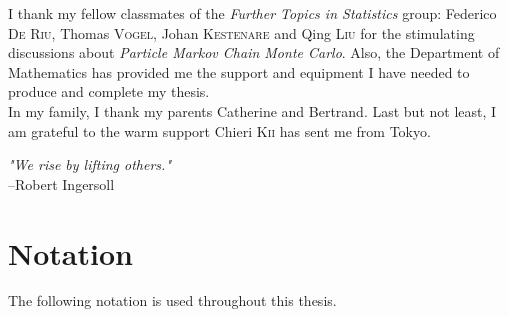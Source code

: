 \documentclass[11pt,a4,twosided,singlespacing,titlepagenumber=on]{scrreprt}
\numberwithin{equation}{chapter} %
\theoremstyle{remark}
\begin{document}
I thank my fellow classmates of the \textit{Further Topics in Statistics} group: Federico \textsc{De Riu}, Thomas \textsc{Vogel}, Johan \textsc{Kestenare} and Qing \textsc{Liu} for the stimulating discussions about \textit{Particle Markov Chain Monte Carlo}. Also, the Department of Mathematics has provided me the support and equipment I have needed to produce and complete my thesis. \\

In my family, I thank my parents Catherine and Bertrand. Last but not least, I am grateful to the warm support Chieri \textsc{Kii} has sent me from Tokyo. \\ 

\begin{flushright} \textit{"We rise by lifting others."} \\
--Robert Ingersoll \\
\end{flushright}

\renewcommand{\contentsname}{Table of Contents}
\tableofcontents

\listoffigures
\listoftables

\chapter*{Notation}
The following notation is used throughout this thesis.
\end{document}
